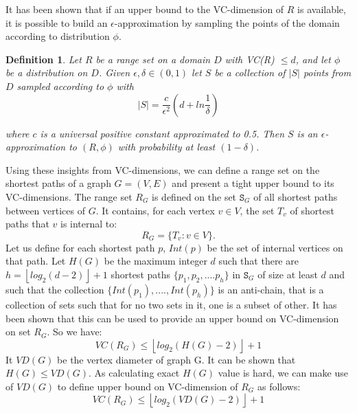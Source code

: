 \documentclass[runningheads,a4paper]{llncs}
\newtheorem{mydef}{Definition}
\begin{document}
It has been shown that if an upper bound to the VC-dimension of $R$ is available, it is possible to build an $\epsilon$-approximation by sampling the points of the domain according to distribution $\phi$.

\begin{mydef}
Let $R$ be a range set on a domain $D$ with VC(R) $\leq d$, and let $\phi$ be a distribution on $D$. Given $\epsilon, \delta \in (0,1)$ let $S$ be a collection of $|S|$ points from $D$ sampled according to $\phi$ with
\begin{equation} \label{sample_size}
|S| = \frac{c}{\epsilon^{2}}(d + ln\frac{1}{\delta})
\end{equation}

where $c$ is a universal positive constant approximated to 0.5. Then $S$ is an $\epsilon$-approximation to $(R,\phi)$ with probability at least $(1-\delta)$.
\end{mydef}

Using these insights from VC-dimensions, we can define a range set on the shortest paths of a graph $G = (V,E)$ and present a tight upper bound to its VC-dimensions. The range set $R_{G}$ is defined on the set $\mathtt{S}_{G}$ of all shortest paths between vertices of $G$. It contains, for each vertex $v \in V$, the set $T_{v}$ of shortest paths that $v$ is internal to: 
$$R_{G} = \{T_{v} : v \in V\}.$$
Let us define for each shortest path $p$, $Int(p)$ be the set of internal vertices on that path.  Let $H(G)$ be the maximum integer $d$ such that there are $h = \left\lfloor{log_{2}(d-2)}\right\rfloor + 1$ shortest paths $\{p_{1},p_{2},....p_{h}\}$
in $\mathtt{S}_{G}$ of size at least $d$ and such that the collection $\{Int(p_{1}),....,Int(p_{h})\}$ is an anti-chain, that is a collection of sets such that for no two sets in it, one is a subset of other. It has been shown that this can be used to provide an upper bound on VC-dimension on set $R_{G}$. So we have:
$$VC(R_{G}) \leq \left\lfloor{log_{2}(H(G) - 2)}\right\rfloor + 1$$
It $VD(G)$ be the vertex diameter of graph G. It can be shown that $H(G) \leq VD(G)$. As calculating exact $H(G)$ value is hard, we can make use of $VD(G)$ to define upper bound on VC-dimension of $R_{G}$ as follows:
$$VC(R_{G}) \leq \left\lfloor{log_{2}(VD(G) - 2)}\right\rfloor + 1$$
\end{document}
